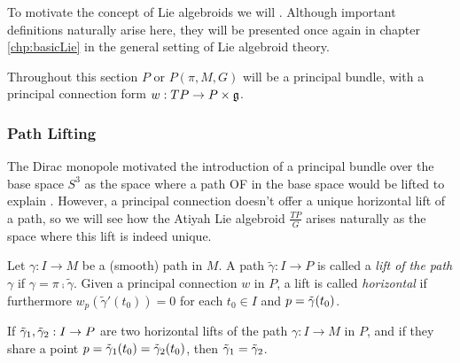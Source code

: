 To motivate the concept of Lie algebroids we will . Although important definitions naturally arise here, they will be presented once again in chapter \ref{chp:basicLie} in the general setting of Lie algebroid theory.

Throughout this section $P$ or $P(\pi, M, G)$ will be a principal bundle, with a principal connection form $w : TP \to P \times \mathfrak{g}$.  

\subsubsection{Path Lifting}

The Dirac monopole motivated the introduction of a principal bundle over the base space $S^3$ as the space where a path OF in the base space would be lifted to explain . However, a principal connection doesn't offer a unique horizontal lift of a path, so we will see how the Atiyah Lie algebroid $\frac{TP}{G}$ arises naturally as the space where this lift is indeed unique.

\begin{definition} 
Let $\gamma: I \to M$ be a (smooth) path in $M$. A path $\tilde{\gamma}: I \to P$ is called a \emph{lift of the path $\gamma$} if $\gamma = \pi \comp \tilde{\gamma}$. Given a principal connection $w$ in $P$, a lift is called \emph{horizontal} if furthermore $w_p(\tilde{\gamma}'(t_0)) = 0$ for each $t_0 \in I$ and $p = \Tilde{\gamma}(t_0)$.
\end{definition}

\begin{lemma} 
If $\Tilde{\gamma}_1, \Tilde{\gamma}_2:I \to P$ are two horizontal lifts of the path $\gamma:I \to M$ in $P$, and if they share a point $p = \Tilde{\gamma}_1(t_0) = \Tilde{\gamma}_2(t_0)$, then $\Tilde{\gamma}_1 = \Tilde{\gamma}_2$. 
\end{lemma}


